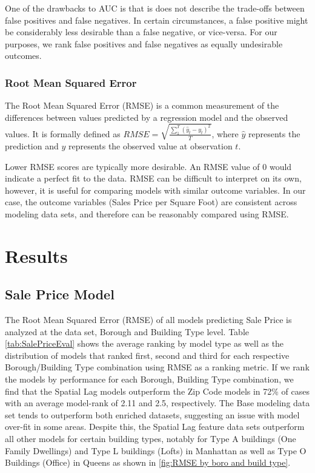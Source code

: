 \documentclass[12pt,]{article}
\begin{document}
One of the drawbacks to AUC is that is does not describe the trade-offs
between false positives and false negatives. In certain circumstances, a
false positive might be considerably less desirable than a false
negative, or vice-versa. For our purposes, we rank false positives and
false negatives as equally undesirable outcomes.

\hypertarget{root-mean-squared-error}{%
\subsubsection{Root Mean Squared Error}\label{root-mean-squared-error}}

The Root Mean Squared Error (RMSE) is a common measurement of the
differences between values predicted by a regression model and the
observed values. It is formally defined as
\(RMSE = \sqrt{ \frac{\sum_{1}^{T} (\hat{y}_t - y_t)^2}{T} }\), where
\(\hat{y}\) represents the prediction and \(y\) represents the observed
value at observation \(t\).

Lower RMSE scores are typically more desirable. An RMSE value of 0 would
indicate a perfect fit to the data. RMSE can be difficult to interpret
on its own, however, it is useful for comparing models with similar
outcome variables. In our case, the outcome variables (Sales Price per
Square Foot) are consistent across modeling data sets, and therefore can
be reasonably compared using RMSE.

\hypertarget{results}{%
\section{Results}\label{results}}

\hypertarget{sale-price-model}{%
\subsection{Sale Price Model}\label{sale-price-model}}

The Root Mean Squared Error (RMSE) of all models predicting Sale Price
is analyzed at the data set, Borough and Building Type level. Table
\ref{tab:SalePriceEval} shows the average ranking by model type as well
as the distribution of models that ranked first, second and third for
each respective Borough/Building Type combination using RMSE as a
ranking metric. If we rank the models by performance for each Borough,
Building Type combination, we find that the Spatial Lag models
outperform the Zip Code models in 72\% of cases with an average
model-rank of 2.11 and 2.5, respectively. The Base modeling data set
tends to outperform both enriched datasets, suggesting an issue with
model over-fit in some areas. Despite this, the Spatial Lag feature data
sets outperform all other models for certain building types, notably for
Type A buildings (One Family Dwellings) and Type L buildings (Lofts) in
Manhattan as well as Type O Buildings (Office) in Queens as shown in
\ref{fig:RMSE by boro and build type}.
\end{document}
